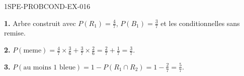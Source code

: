 \begin{corrige}{1SPE-PROBCOND-EX-016}

\textbf{1.} Arbre construit avec $P(R_1)=\frac{4}{7}$, $P(B_1)=\frac{3}{7}$ et les conditionnelles sans remise.

\medskip
\textbf{2.} $P(\text{meme}) = \frac{4}{7}\times\frac{3}{6} + \frac{3}{7}\times\frac{2}{6} = \frac{2}{7} + \frac{1}{7} = \frac{3}{7}$.

\medskip
\textbf{3.} $P(\text{au moins 1 bleue}) = 1 - P(R_1 \cap R_2) = 1 - \frac{2}{7} = \frac{5}{7}$.

\end{corrige}
